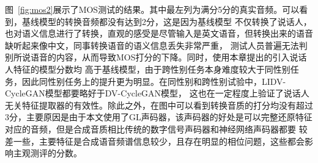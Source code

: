 图~\ref{fig:mos2}展示了MOS测试的结果。其中最左列为满分5分的真实音频。可以看到，基线模型的转换音频都没有达到2分，这是因为基线模型
不仅转换了说话人，也对语义信息进行了转换，直观的感受是尽管输入是英文语音，但转换出来的语音缺听起来像中文，同事转换语音的语义信息丢失非常严重，
测试人员普遍无法判别所说语音的内容，从而导致MOS打分的下降。同时，使用本章提出的引入说话人特征的模型分数均
高于基线模型，由于跨性别任务本身难度较大于同性别任务，因此同性别任务上的提升更为明显。在同性别和跨性别试验中，LIDV-CycleGAN模型都要略好于DV-CycleGAN模型，
这也在一定程度上验证了说话人无关特征提取器的有效性。除此之外，在图中可以看到转换音质的打分均没有超过
3分，主要原因是由于本文使用了GL声码器，该声码器的好处是可以完整还原特征对应的音频，但是合成音质相比传统的数字信号声码器和神经网络声码器都要
较差一些，主要特征是合成语音频谱信息较少，且存在明显的相位问题，这些都会影响主观测评的分数。

